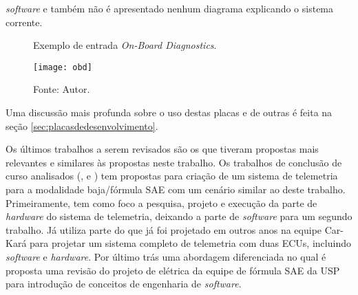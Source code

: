\textit{software} e também não é apresentado nenhum diagrama explicando o sistema corrente.    

\begin{figure}[!htb]
	\centering
		\caption{Exemplo de entrada \textit{On-Board Diagnostics}.}
		\texttt{[image: obd]} 
		\caption*{Fonte: Autor.}
		\label{fig:obd}
\end{figure}

Uma discussão mais profunda sobre o uso destas placas e de outras é feita na seção \ref{sec:placasdedesenvolvimento}. 

Os últimos trabalhos a serem revisados são os que tiveram propostas mais relevantes e similares às propostas neste trabalho. Os trabalhos de conclusão de curso analisados (\cite{Dias2010}, \cite{Nunes2016} e \cite{Pereira2012}) tem propostas para criação de um sistema de telemetria para a modalidade baja/fórmula SAE com um cenário similar ao deste trabalho. Primeiramente,  tem como foco a pesquisa, projeto e execução da parte de \textit{hardware} do sistema de telemetria, deixando a parte de \textit{software} para um segundo trabalho. Já  utiliza parte do que já foi projetado em outros anos na equipe Car-Kará para projetar um sistema completo de telemetria com duas ECUs, incluindo \textit{software} e \textit{hardware}. Por último  trás uma abordagem diferenciada no qual é proposta uma revisão do projeto de elétrica da equipe de fórmula SAE da USP para introdução de conceitos de engenharia de \textit{software}.

